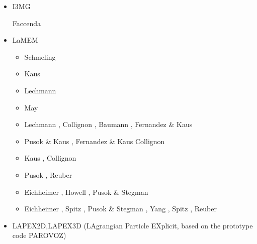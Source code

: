 \begin{itemize}
\item I3MG


\begin{scriptsize}
\twothousandfourteen Faccenda \cite{facc14}
\end{scriptsize}


\item LaMEM 

\begin{scriptsize}
\begin{itemize}
\item[\twothousandeight] Schmeling \etal \cite{scbe08}
\item[\twothousandten] Kaus \etal \cite{kamm10}
\item[\twothousandeleven] Lechmann \etal \cite{lemk11}
\item[\twothousandtwelve] May \cite{may12}
\item[\twothousandfourteen] Lechmann \etal \cite{lesh14}, Collignon \etal \cite{cokm14}, 
                            Baumann \etal \cite{bakp14}, 
                            Fernandez \& Kaus \cite{feka14a,feka14b}
\item[\twothousandfifteen] Pusok \& Kaus \cite{puka15}, Fernandez \& Kaus \cite{feka15}
                           Collignon \etal \cite{cofk15}
\item[\twothousandsixteen] Kaus \etal \cite{kapb16}, Collignon \etal \cite{coyc16}
\item[\twothousandeighteen] Pusok \etal \cite{pukp18}, Reuber \etal \cite{rekp18,repk18}
\item[\twothousandnineteen] Eichheimer \etal \cite{eitp19}, Howell \etal \cite{hooi19}, 
                            Pusok \& Stegman \cite{pust19}
\item[\twothousandtwenty] Eichheimer \etal \cite{eitf20}, Spitz \etal \cite{spsk20}, 
                          Pusok \& Stegman \cite{pust20}, Yang \etal \cite{yakl20}, 
                          Spitz \etal \cite{spbe20}, Reuber \etal \cite{rehp20}
\end{itemize}
\end{scriptsize}

\item LAPEX2D,LAPEX3D  (LAgrangian Particle EXplicit, based on the prototype code PAROVOZ) 


\end{itemize}
